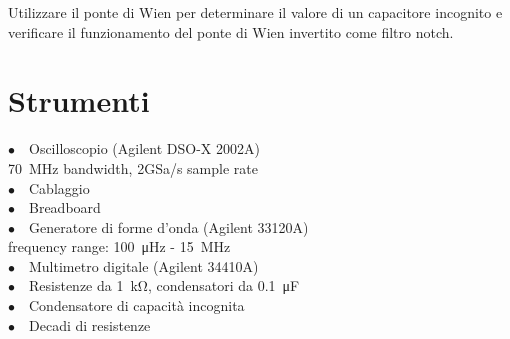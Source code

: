 
Utilizzare il ponte di Wien per determinare il valore di un capacitore incognito e verificare il funzionamento del ponte di Wien invertito come filtro notch.

\section{Strumenti}
$\bullet \quad$Oscilloscopio (Agilent DSO-X 2002A)\\
\phantom{xxxx}\SI{70}{\mega\hertz} bandwidth, 2GSa/s sample rate\\
$\bullet \quad$Cablaggio\\
$\bullet \quad$Breadboard\\
$\bullet \quad$Generatore di forme d'onda (Agilent 33120A)\\
\phantom{xxxx}frequency range: \SI{100}{\micro\hertz} - \SI{15}{\mega\hertz}\\
$\bullet \quad$Multimetro digitale (Agilent 34410A)\\
$\bullet \quad$Resistenze da \SI{1}{\kilo\ohm}, condensatori da \SI{0.1}{\micro\farad}\\
$\bullet \quad$Condensatore di capacità incognita\\
$\bullet \quad$Decadi di resistenze 